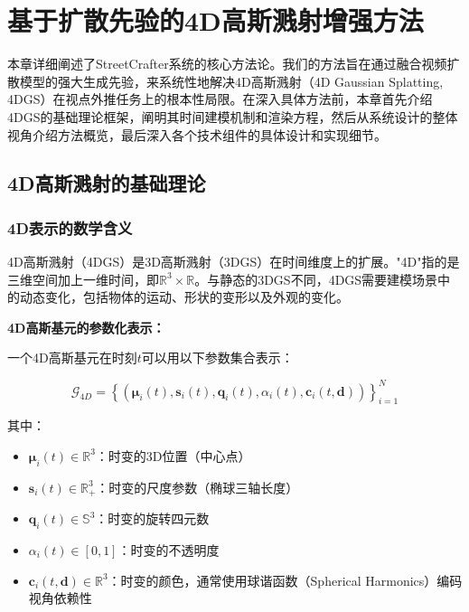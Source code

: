 
\chapter{基于扩散先验的4D高斯溅射增强方法}

本章详细阐述了StreetCrafter系统的核心方法论。我们的方法旨在通过融合视频扩散模型的强大生成先验，来系统性地解决4D高斯溅射（4D Gaussian Splatting, 4DGS）在视点外推任务上的根本性局限。在深入具体方法前，本章首先介绍4DGS的基础理论框架，阐明其时间建模机制和渲染方程，然后从系统设计的整体视角介绍方法概览，最后深入各个技术组件的具体设计和实现细节。

\section{4D高斯溅射的基础理论}

\subsection{4D表示的数学含义}

4D高斯溅射（4DGS）是3D高斯溅射（3DGS）在时间维度上的扩展。"4D"指的是三维空间加上一维时间，即$\mathbb{R}^3 \times \mathbb{R}$。与静态的3DGS不同，4DGS需要建模场景中的动态变化，包括物体的运动、形状的变形以及外观的变化。

\textbf{4D高斯基元的参数化表示：}

一个4D高斯基元在时刻$t$可以用以下参数集合表示：

\begin{equation}
\mathcal{G}_{4D} = \left\{(\boldsymbol{\mu}_i(t), \mathbf{s}_i(t), \mathbf{q}_i(t), \alpha_i(t), \mathbf{c}_i(t, \mathbf{d}))\right\}_{i=1}^{N}
\label{eq:4dgs_parameterization}
\end{equation}

其中：
\begin{itemize}
\item $\boldsymbol{\mu}_i(t) \in \mathbb{R}^3$：时变的3D位置（中心点）
\item $\mathbf{s}_i(t) \in \mathbb{R}^3_+$：时变的尺度参数（椭球三轴长度）
\item $\mathbf{q}_i(t) \in \mathbb{S}^3$：时变的旋转四元数
\item $\alpha_i(t) \in [0,1]$：时变的不透明度
\item $\mathbf{c}_i(t, \mathbf{d}) \in \mathbb{R}^3$：时变的颜色，通常使用球谐函数（Spherical Harmonics）编码视角依赖性
\end{itemize}


